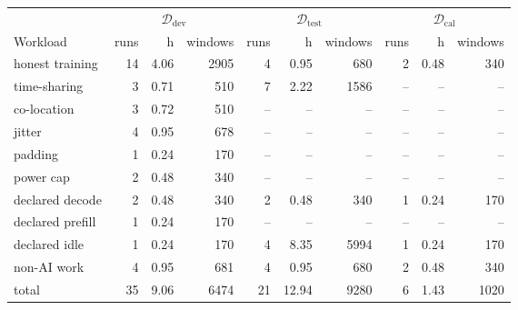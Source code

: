 \begin{tabular}{lrrrrrrrrr}
\toprule
 & \multicolumn{3}{c}{$\mathcal{D}_{\mathrm{dev}}$} & \multicolumn{3}{c}{$\mathcal{D}_{\mathrm{test}}$} & \multicolumn{3}{c}{$\mathcal{D}_{\mathrm{cal}}$} \\
\cmidrule(lr){2-4}\cmidrule(lr){5-7}\cmidrule(lr){8-10}
Workload & runs & h & windows & runs & h & windows & runs & h & windows \\
\midrule
honest training & 14 & 4.06 & 2905 & 4 & 0.95 & 680 & 2 & 0.48 & 340 \\
time-sharing & 3 & 0.71 & 510 & 7 & 2.22 & 1586 & -- & -- & -- \\
co-location & 3 & 0.72 & 510 & -- & -- & -- & -- & -- & -- \\
jitter & 4 & 0.95 & 678 & -- & -- & -- & -- & -- & -- \\
padding & 1 & 0.24 & 170 & -- & -- & -- & -- & -- & -- \\
power cap & 2 & 0.48 & 340 & -- & -- & -- & -- & -- & -- \\
declared decode & 2 & 0.48 & 340 & 2 & 0.48 & 340 & 1 & 0.24 & 170 \\
declared prefill & 1 & 0.24 & 170 & -- & -- & -- & -- & -- & -- \\
declared idle & 1 & 0.24 & 170 & 4 & 8.35 & 5994 & 1 & 0.24 & 170 \\
non-AI work & 4 & 0.95 & 681 & 4 & 0.95 & 680 & 2 & 0.48 & 340 \\
\midrule
total & 35 & 9.06 & 6474 & 21 & 12.94 & 9280 & 6 & 1.43 & 1020 \\
\bottomrule
\end{tabular}
